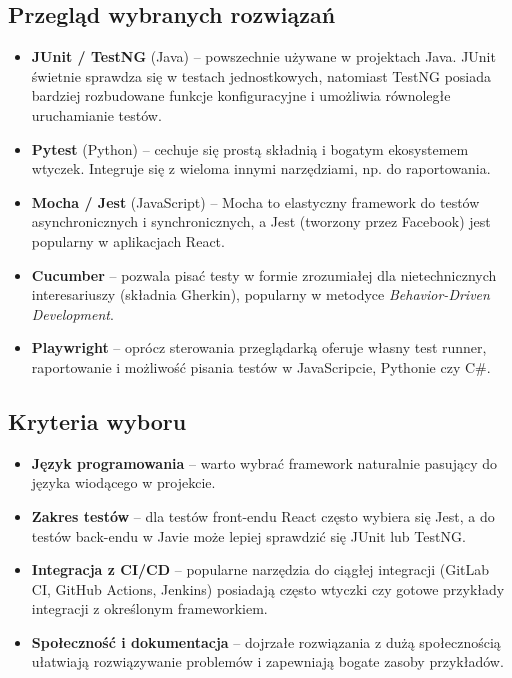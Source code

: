 \documentclass[12pt]{report}
\begin{document}
\subsection*{Przegląd wybranych rozwiązań}
\begin{itemize}
    \item \textbf{JUnit / TestNG} (Java) -- powszechnie używane w projektach Java. JUnit świetnie sprawdza się w testach jednostkowych, natomiast TestNG posiada bardziej rozbudowane funkcje konfiguracyjne i umożliwia równoległe uruchamianie testów.
    \item \textbf{Pytest} (Python) -- cechuje się prostą składnią i bogatym ekosystemem wtyczek. Integruje się z wieloma innymi narzędziami, np. do raportowania.
    \item \textbf{Mocha / Jest} (JavaScript) -- Mocha to elastyczny framework do testów asynchronicznych i synchronicznych, a Jest (tworzony przez Facebook) jest popularny w aplikacjach React.
    \item \textbf{Cucumber} -- pozwala pisać testy w formie zrozumiałej dla nietechnicznych interesariuszy (składnia Gherkin), popularny w metodyce \emph{Behavior-Driven Development}.
    \item \textbf{Playwright} -- oprócz sterowania przeglądarką oferuje własny test runner, raportowanie i możliwość pisania testów w JavaScripcie, Pythonie czy C\#.
\end{itemize}

\subsection*{Kryteria wyboru}
\begin{itemize}
    \item \textbf{Język programowania} -- warto wybrać framework naturalnie pasujący do języka wiodącego w projekcie.
    \item \textbf{Zakres testów} -- dla testów front-endu React często wybiera się Jest, a do testów back-endu w Javie może lepiej sprawdzić się JUnit lub TestNG.
    \item \textbf{Integracja z CI/CD} -- popularne narzędzia do ciągłej integracji (GitLab CI, GitHub Actions, Jenkins) posiadają często wtyczki czy gotowe przykłady integracji z określonym frameworkiem.
    \item \textbf{Społeczność i dokumentacja} -- dojrzałe rozwiązania z dużą społecznością ułatwiają rozwiązywanie problemów i zapewniają bogate zasoby przykładów.
\end{itemize}
\end{document}
